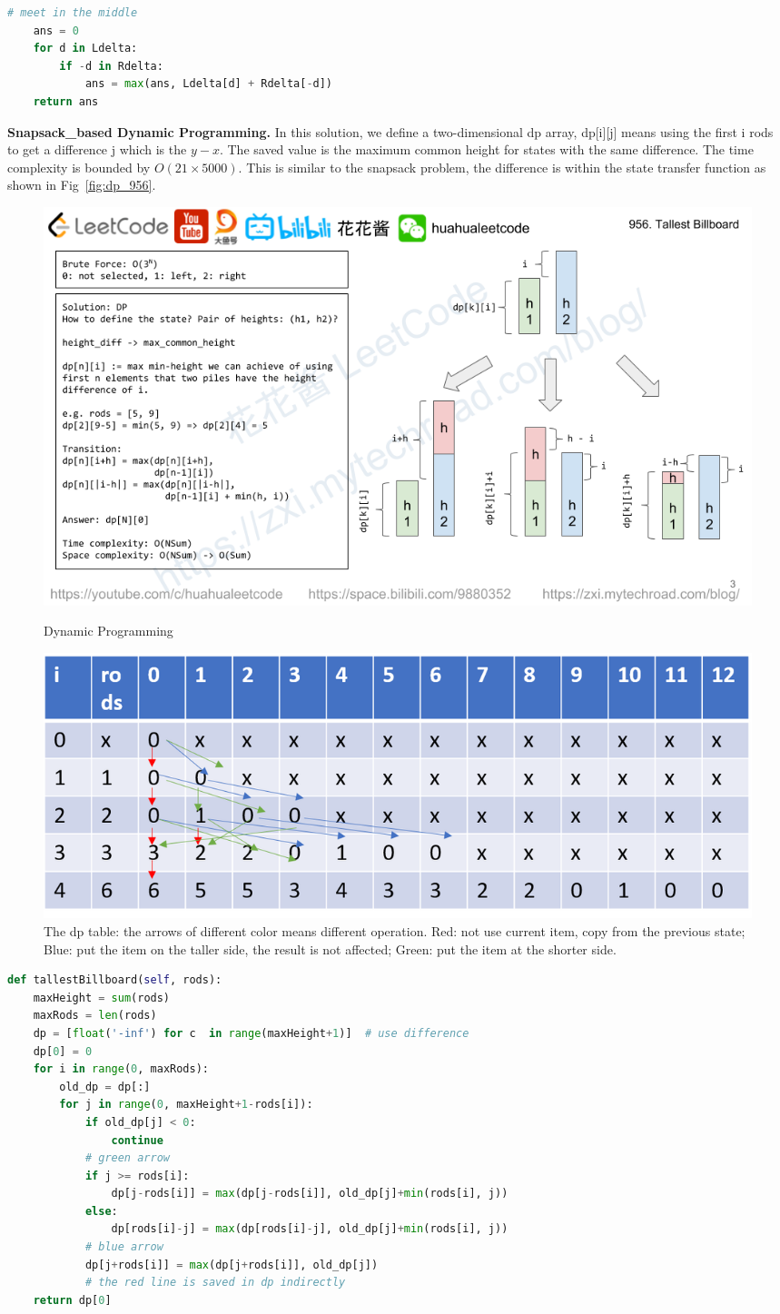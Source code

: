 \documentclass[../algorithms.tex]{subfiles}
\begin{document}
\begin{examples}
\begin{lstlisting}[language=Python]
    # meet in the middle
    ans = 0
    for d in Ldelta:
        if -d in Rdelta:
            ans = max(ans, Ldelta[d] + Rdelta[-d])
    return ans
\end{lstlisting}
\textbf{Snapsack\_based Dynamic Programming.}  In this solution, we define a two-dimensional dp array, dp[i][j] means using the first i rods to get a difference j which is the $y-x$. The saved value is the maximum common height for states with the same difference.  The time complexity is bounded by $O(21\times 5000)$. This is similar to the snapsack problem, the difference is within the state transfer function as shown in Fig~\ref{fig:dp_956}. 
\begin{figure}[h]
    \centering
    \includegraphics[width=0.9\columnwidth]{fig/956-ep234.png}
    \caption{Dynamic Programming}
    \label{fig:dp_956}
    \includegraphics[width=0.9\columnwidth]{fig/956_dp_table.png}
    \caption{The dp table: the arrows of different color means different operation. Red: not use current item, copy from the previous state; Blue: put the item on the taller side, the result is not affected; Green: put the item at the shorter side. }
    \label{fig:dp_956_2}
\end{figure}
\begin{lstlisting}[language=Python]
 def tallestBillboard(self, rods):
    maxHeight = sum(rods)
    maxRods = len(rods)
    dp = [float('-inf') for c  in range(maxHeight+1)]  # use difference
    dp[0] = 0
    for i in range(0, maxRods):
        old_dp = dp[:] 
        for j in range(0, maxHeight+1-rods[i]):
            if old_dp[j] < 0:
                continue
            # green arrow
            if j >= rods[i]:
                dp[j-rods[i]] = max(dp[j-rods[i]], old_dp[j]+min(rods[i], j))
            else:
                dp[rods[i]-j] = max(dp[rods[i]-j], old_dp[j]+min(rods[i], j))
            # blue arrow
            dp[j+rods[i]] = max(dp[j+rods[i]], old_dp[j])                
            # the red line is saved in dp indirectly
    return dp[0]
\end{lstlisting}
\end{examples}
\end{document}
